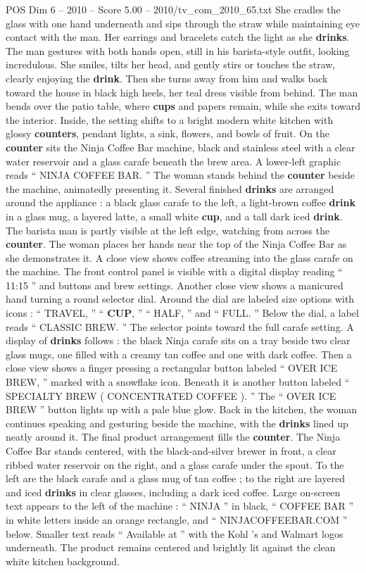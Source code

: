 \begin{textsample}{POS Dim 6 – 2010 – Score 5.00 – 2010/tv\_com\_2010\_65.txt}
She cradles the glass with one hand underneath and sips through the straw while maintaining eye contact with the man.
Her earrings and bracelets catch the light as she \textbf{drinks}.
The man gestures with both hands open, still in his barista-style outfit, looking incredulous.
She smiles, tilts her head, and gently stirs or touches the straw, clearly enjoying the \textbf{drink}.
Then she turns away from him and walks back toward the house in black high heels, her teal dress visible from behind.
The man bends over the patio table, where \textbf{cups} and papers remain, while she exits toward the interior.
Inside, the setting shifts to a bright modern white kitchen with glossy \textbf{counters}, pendant lights, a sink, flowers, and bowls of fruit.
On the \textbf{counter} sits the Ninja Coffee Bar machine, black and stainless steel with a clear water reservoir and a glass carafe beneath the brew area.
A lower-left graphic reads “ NINJA COFFEE BAR. ” The woman stands behind the \textbf{counter} beside the machine, animatedly presenting it.
Several finished \textbf{drinks} are arranged around the appliance : a black glass carafe to the left, a light-brown coffee \textbf{drink} in a glass mug, a layered latte, a small white \textbf{cup}, and a tall dark iced \textbf{drink}.
The barista man is partly visible at the left edge, watching from across the \textbf{counter}.
The woman places her hands near the top of the Ninja Coffee Bar as she demonstrates it.
A close view shows coffee streaming into the glass carafe on the machine.
The front control panel is visible with a digital display reading “ 11:15 ” and buttons and brew settings.
Another close view shows a manicured hand turning a round selector dial.
Around the dial are labeled size options with icons : “ TRAVEL, ” “ \textbf{CUP}, ” “ HALF, ” and “ FULL. ” Below the dial, a label reads “ CLASSIC BREW. ” The selector points toward the full carafe setting.
A display of \textbf{drinks} follows : the black Ninja carafe sits on a tray beside two clear glass mugs, one filled with a creamy tan coffee and one with dark coffee.
Then a close view shows a finger pressing a rectangular button labeled “ OVER ICE BREW, ” marked with a snowflake icon.
Beneath it is another button labeled “ SPECIALTY BREW ( CONCENTRATED COFFEE ). ” The “ OVER ICE BREW ” button lights up with a pale blue glow.
Back in the kitchen, the woman continues speaking and gesturing beside the machine, with the \textbf{drinks} lined up neatly around it.
The final product arrangement fills the \textbf{counter}.
The Ninja Coffee Bar stands centered, with the black-and-silver brewer in front, a clear ribbed water reservoir on the right, and a glass carafe under the spout.
To the left are the black carafe and a glass mug of tan coffee ; to the right are layered and iced \textbf{drinks} in clear glasses, including a dark iced coffee.
Large on-screen text appears to the left of the machine : “ NINJA ” in black, “ COFFEE BAR ” in white letters inside an orange rectangle, and “ NINJACOFFEEBAR.COM ” below.
Smaller text reads “ Available at ” with the Kohl ’s and Walmart logos underneath.
The product remains centered and brightly lit against the clean white kitchen background.

\end{textsample}
